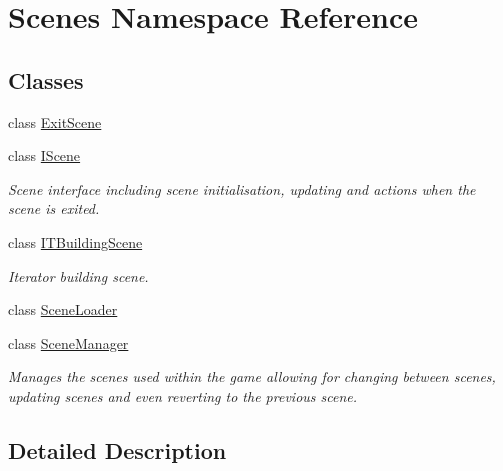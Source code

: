 \hypertarget{namespace_scenes}{\section{Scenes Namespace Reference}
\label{namespace_scenes}
}
\subsection*{Classes}
\begin{DoxyCompactItemize}
\item 
class \hyperlink{class_scenes_1_1_exit_scene}{Exit\-Scene}
\item 
class \hyperlink{class_scenes_1_1_i_scene}{I\-Scene}
\begin{DoxyCompactList}\small\item\em Scene interface including scene initialisation, updating and actions when the scene is exited. \end{DoxyCompactList}\item 
class \hyperlink{class_scenes_1_1_i_t_building_scene}{I\-T\-Building\-Scene}
\begin{DoxyCompactList}\small\item\em Iterator building scene. \end{DoxyCompactList}\item 
class \hyperlink{class_scenes_1_1_scene_loader}{Scene\-Loader}
\item 
class \hyperlink{class_scenes_1_1_scene_manager}{Scene\-Manager}
\begin{DoxyCompactList}\small\item\em Manages the scenes used within the game allowing for changing between scenes, updating scenes and even reverting to the previous scene. \end{DoxyCompactList}\end{DoxyCompactItemize}


\subsection{Detailed Description}
